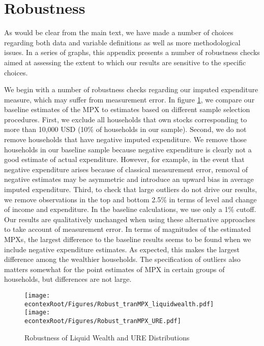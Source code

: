 \documentclass[titlepage]{\econtex}\newcommand{\texname}{ConsumptionHeterogeneity}
\begin{document}
	\section{Robustness} \label{robustness}
	As would be clear from the main text, we have made a number of choices regarding both data and variable definitions as well as more methodological issues. In a series of graphs, this appendix presents a number of robustness checks aimed at assessing the extent to which our results are sensitive to the specific choices. 
	
	We begin with a number of robustness checks regarding our imputed expenditure measure, which may suffer from measurement error. In figure \ref{fig:Robust_liquidURE}, we compare our baseline estimates of the MPX to estimates based on different sample selection procedures. First, we exclude all households that own stocks corresponding to more than 10,000 USD (10\% of households in our sample). Second, we do not remove households that have negative imputed expenditure. We remove those households in our baseline sample because negative expenditure is clearly not a good estimate of actual expenditure. However, for example, in the event that negative expenditure arises because of classical measurement error, removal of negative estimates may be asymmetric and introduce an upward bias in average imputed expenditure. Third, to check that large outliers do not drive our results, we remove observations in the top and bottom 2.5\% in terms of level and change of income and expenditure. In the baseline calculations, we use only a 1\% cutoff. Our results are qualitatively unchanged when using these alternative approaches to take account of measurement error. In terms of magnitudes of the estimated MPXs, the largest difference to the baseline results seems to be found when we include negative expenditure estimates. As expected, this makes the largest difference among the wealthier households. The specification of outliers also matters somewhat for the point estimates of MPX in certain groups of households, but differences are not large. 
	
	\begin{figure}
		\begin{centering}
			\texttt{[image: \\econtexRoot/Figures/Robust\_tranMPX\_liquidwealth.pdf]}
			\texttt{[image: \\econtexRoot/Figures/Robust\_tranMPX\_URE.pdf]}
			\caption{Robustness of Liquid Wealth and URE Distributions}
			\label{fig:Robust_liquidURE}
		\end{centering}
	\end{figure}
	
\end{document}
